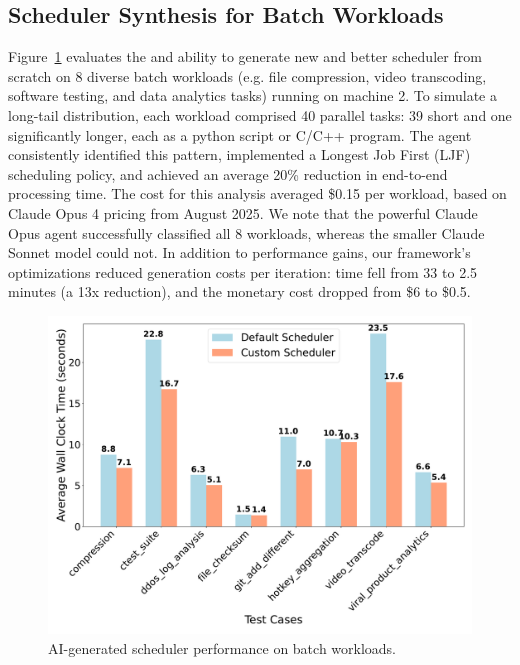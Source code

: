 \subsection{Scheduler Synthesis for Batch Workloads}

Figure~\ref{fig:batch-performance} evaluates the \sys  and \agent  ability to generate new and better scheduler from scratch on 8 diverse batch workloads (e.g. file compression, video transcoding, software testing, and data analytics tasks) running on machine 2. To simulate a long-tail distribution, each workload comprised 40 parallel tasks: 39 short and one significantly longer, each as a python script or C/C++ program. The agent consistently identified this pattern, implemented a Longest Job First (LJF) scheduling policy, and achieved an average 20\% reduction in end-to-end processing time. The cost for this analysis averaged \$0.15 per workload, based on Claude Opus 4 pricing from August 2025. We note that the powerful Claude Opus agent successfully classified all 8 workloads, whereas the smaller Claude Sonnet model could not. In addition to performance gains, our framework's optimizations reduced generation costs per iteration: time fell from 33 to 2.5 minutes (a 13x reduction), and the monetary cost dropped from \$6 to \$0.5.

\begin{figure}[h]
\centering
\includegraphics[width=0.9\columnwidth]{sections/scheduler_performance_comparison.pdf}
\caption{AI-generated scheduler performance on batch workloads.}
\label{fig:batch-performance}
\end{figure}



